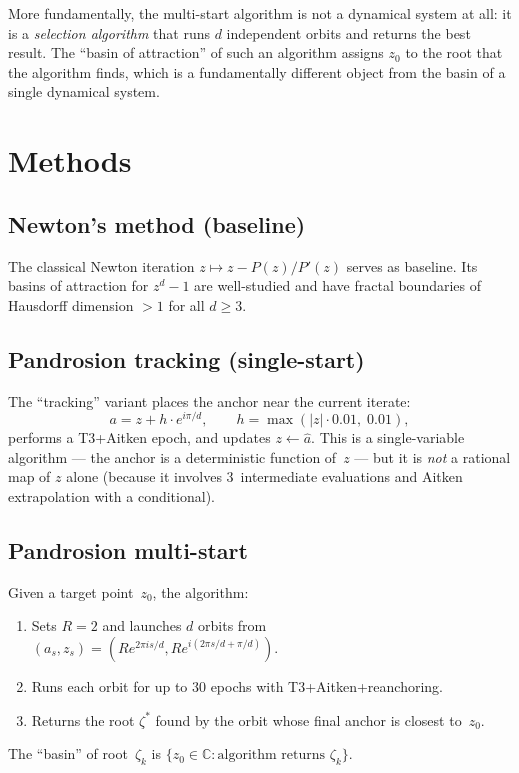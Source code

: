 \documentclass[11pt,a4paper]{article}
\theoremstyle{definition}
\theoremstyle{remark}
\begin{document}
More fundamentally, the multi-start algorithm is not a dynamical system at all: it is a \emph{selection algorithm} that runs $d$ independent orbits and returns the best result.  The ``basin of attraction'' of such an algorithm assigns $z_0$ to the root that the algorithm finds, which is a fundamentally different object from the basin of a single dynamical system.

\section{Methods}
\label{sec:methods}

\subsection{Newton's method (baseline)}

The classical Newton iteration $z \mapsto z - P(z)/P'(z)$ serves as baseline.  Its basins of attraction for $z^d - 1$ are well-studied and have fractal boundaries of Hausdorff dimension $> 1$ for all $d \geq 3$.

\subsection{Pandrosion tracking (single-start)}

The ``tracking'' variant places the anchor near the current iterate:
\[
a = z + h \cdot e^{i\pi/d}, \qquad h = \max(|z| \cdot 0.01,\; 0.01),
\]
performs a T3+Aitken epoch, and updates $z \leftarrow \hat{a}$.  This is a single-variable algorithm --- the anchor is a deterministic function of~$z$ --- but it is \emph{not} a rational map of $z$ alone (because it involves 3~intermediate evaluations and Aitken extrapolation with a conditional).

\subsection{Pandrosion multi-start}
\label{sec:multistart}

Given a target point~$z_0$, the algorithm:
\begin{enumerate}[nosep]
\item Sets $R = 2$ and launches $d$ orbits from $(a_s, z_s) = (Re^{2\pi i s/d}, Re^{i(2\pi s/d + \pi/d)})$.
\item Runs each orbit for up to $30$ epochs with T3+Aitken+reanchoring.
\item Returns the root $\zeta^*$ found by the orbit whose final anchor is closest to~$z_0$.
\end{enumerate}
The ``basin'' of root~$\zeta_k$ is $\{z_0 \in \mathbb{C} : \text{algorithm returns } \zeta_k\}$.
\end{document}

